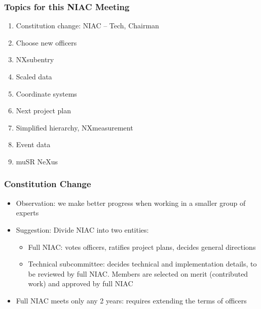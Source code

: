 \documentclass{beamer}
\begin{document}


\begin{frame} \frametitle{Topics for this NIAC Meeting}
\begin{enumerate}
\item Constitution change: NIAC -- Tech, Chairman
\item Choose new  officers
\item NXsubentry
\item Scaled data
\item Coordinate systems
\item Next project plan
\item Simplified hierarchy, NXmeasurement
\item Event data
\item muSR NeXus
\end{enumerate}
\end{frame}


\begin{frame} \frametitle{Constitution Change}
\begin{itemize}
\item Observation: we make better progress when working in a smaller group of 
 experts
 \item Suggestion: Divide NIAC into two entities: 
\begin{itemize}
\item Full NIAC: votes officers, ratifies project plans, decides general directions  
\item Technical subcommittee: decides technical and implementation details, to be 
reviewed by full NIAC. Members are selected 
 on merit (contributed work) and approved by full NIAC
\end{itemize}
\item Full NIAC meets only any 2 years: requires extending the terms of officers
\end{itemize}
\end{frame}
\end{document}
